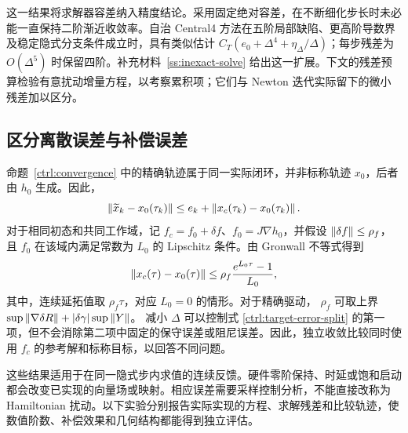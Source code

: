 这一结果将求解器容差纳入精度结论。采用固定绝对容差，在不断细化步长时未必能一直保持二阶渐近收敛率。自治 Central4 方法在五阶局部缺陷、更高阶导数界及稳定隐式分支条件成立时，具有类似估计
$C_T(e_0+\Delta^4+\eta_\Delta/\Delta)$；每步残差为 $O(\Delta^5)$ 时保留四阶。补充材料~\ref{ss:inexact-solve} 给出这一扩展。下文的残差预算检验有意扰动增量方程，以考察累积项；它们与 Newton 迭代实际留下的微小残差加以区分。

\subsection{区分离散误差与补偿误差}
\label{ctrl:error-separation}

命题~\ref{ctrl:convergence} 中的精确轨迹属于同一实际闭环，并非标称轨迹 $x_0$，后者由 $h_0$ 生成。因此，
\begin{equation}\label{ctrl:target-error-split}
 \left\lVert\widetilde x_k-x_0(\tau_k)\right\rVert
 \le e_k+\left\lVert x_c(\tau_k)-x_0(\tau_k)\right\rVert.
\end{equation}
对于相同初态和共同工作域，记
$f_c=f_0+\delta f$、$f_0=J\nabla h_0$，并假设
$\left\lVert\delta f\right\rVert\le\rho_f$，且 $f_0$ 在该域内满足常数为 $L_0$ 的 Lipschitz 条件。由 Gronwall 不等式得到
\[
 \left\lVert x_c(\tau)-x_0(\tau)\right\rVert
 \le \rho_f\frac{e^{L_0\tau}-1}{L_0},
\]
其中，连续延拓值取 $\rho_f\tau$，对应 $L_0=0$ 的情形。对于精确驱动，
$\rho_f$ 可取上界 $\sup\left\lVert\nabla\delta R\right\rVert+|\delta\gamma|\sup\left\lVert Y\right\rVert$。
减小 $\Delta$ 可以控制式 \eqref{ctrl:target-error-split} 的第一项，但不会消除第二项中固定的保守误差或阻尼误差。因此，独立收敛比较同时使用 $f_c$ 的参考解和标称目标，以回答不同问题。

这些结果适用于在同一隐式步内求值的连续反馈。硬件零阶保持、时延或饱和启动都会改变已实现的向量场或映射。相应误差需要采样控制分析，不能直接改称为 Hamiltonian 扰动。以下实验分别报告实际实现的方程、求解残差和比较轨迹，使数值阶数、补偿效果和几何结构都能得到独立评估。

